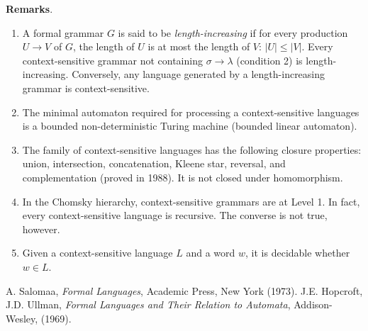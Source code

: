 \documentclass[12pt]{article}
\begin{document}
\textbf{Remarks}.
\begin{enumerate}
\item
A formal grammar $G$ is said to be \emph{length-increasing} if for every production $U\to V$ of $G$, the length of $U$ is at most the length of $V$: $|U|\le |V|$.  Every context-sensitive grammar not containing $\sigma\to \lambda$ (condition 2) is length-increasing.  Conversely, any language generated by a length-increasing grammar is context-sensitive.
\item
The minimal automaton required for processing a context-sensitive languages is a bounded non-deterministic Turing machine (bounded linear automaton).
\item 
The family of context-sensitive languages has the following closure properties: union, intersection, concatenation, Kleene star, reversal, and complementation (proved in 1988).  It is not closed under homomorphism.
\item
In the Chomsky hierarchy, context-sensitive grammars are at Level 1.  In fact, every context-sensitive language is recursive.  The converse is not true, however.
\item
Given a context-sensitive language $L$ and a word $w$, it is decidable whether $w\in L$.
\end{enumerate}

\begin{thebibliography}{9}
 A. Salomaa, {\em Formal Languages}, Academic Press, New York (1973).
 J.E. Hopcroft, J.D. Ullman, {\em Formal Languages and Their Relation to Automata}, Addison-Wesley, (1969).
\end{thebibliography}
\end{document}
